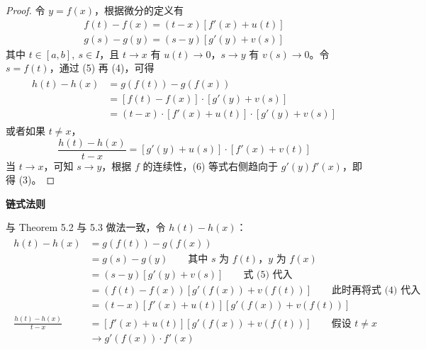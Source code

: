 \documentclass[../poma-notes.tex]{subfiles}
\begin{document}
\begin{proof}
  令 $y = f(x)$，根据微分的定义有
  \begin{align}
    f(t) - f(x) = (t - x)[f'(x) + u(t)] \\
    g(s) - g(y) = (s - y)[g'(y) + v(s)]
  \end{align}
  其中 $t \in [a,b],\ s \in I$，且 $t \to x$ 有 $u(t) \to 0$，$s \to y$ 有 $v(s) \to 0$。令 $s = f(t)$，通过 (5)
  再 (4)，可得
  \begin{align*}
    \begin{split}
      h(t) - h(x) & = g(f(t)) - g(f(x)) \\
      & = [f(t) - f(x)] \cdot [g'(y) + v(s)] \\
      & = (t - x) \cdot [f'(x) + u(t)] \cdot [g'(y) + v(s)]
    \end{split}
  \end{align*}
  或者如果 $t \ne x$，
  \begin{equation}
    \frac{h(t) - h(x)}{t - x} = [g'(y) + u(s)] \cdot [f'(x) + v(t)]
  \end{equation}
  当 $t \to x$，可知 $s \to y$，根据 $f$ 的连续性，(6) 等式右侧趋向于 $g'(y) f'(x)$，即得 (3)。
\end{proof}

\begin{anote}
  \textbf{链式法则}

  与 Theorem 5.2 与 5.3 做法一致，令 $h(t) - h(x)$：
  \begin{align*}
    \begin{split}
      h(t) - h(x) &= g(f(t)) - g(f(x)) \\
      &= g(s) - g(y) \qquad \text{其中 $s$ 为 $f(t)$，$y$ 为 $f(x)$} \\
      &= (s - y)[g'(y) + v(s)] \qquad \text{式 (5) 代入} \\
      &= (f(t) - f(x))[g'(f(x)) + v(f(t))] \qquad \text{此时再将式 (4) 代入} \\
      &= (t - x)[f'(x) + u(t)][g'(f(x)) + v(f(t))] \\
      \frac{h(t) - h(x)}{t - x} &= [f'(x) + u(t)][g'(f(x)) + v(f(t))] \qquad \text{假设 $t \ne x$} \\
      &\to g'(f(x)) \cdot f'(x)
    \end{split}
  \end{align*}
\end{anote}
\end{document}
